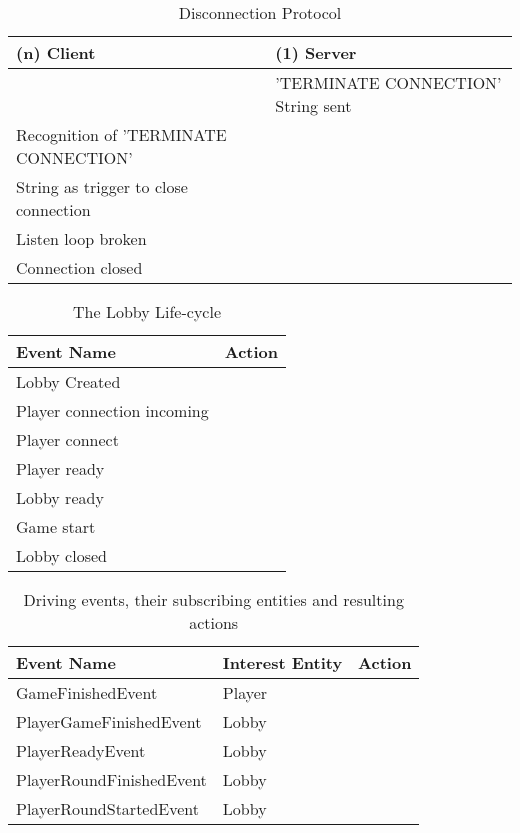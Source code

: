 \begin{table}[H]
	\centering
	\begin{tabular}{ | l | l | }
				\hline
				(n) Client & (1) Server  \\
				\hline
				\hline
				&  'TERMINATE CONNECTION' String sent \\
				\hline
				Recognition of 'TERMINATE CONNECTION' & \\ 
				String as trigger to close connection & \\
				\hline 
				Listen loop broken & \\
				\hline
				Connection closed & \\
				\hline
	\end{tabular}
	\caption{Disconnection Protocol}
	\label{tab:disconnectionProtocol}
\end{table}

\begin{table}[H]
	\centering
	\begin{tabular}{ | l | l | }
		\hline
		Event Name & Action  \\
		\hline
		\hline
		Lobby Created & \\
		\hline
		Player connection incoming & \\
		\hline
		Player connect & \\
		\hline
		Player ready & \\
		\hline
		Lobby ready & \\ 
		\hline
		Game start  & \\
		\hline
		Lobby closed & \\
		\hline
	\end{tabular}
	\caption{The Lobby Life-cycle}
	\label{tab:lobbyLifecycle}
\end{table}

\begin{table}[H]
	\centering
	\begin{tabular}{ | l | l | l | }
		\hline
		Event Name & Interest Entity & Action  \\
		\hline
		\hline
		GameFinishedEvent & Player & \\ 
		\hline
		PlayerGameFinishedEvent & Lobby & \\
		\hline
		PlayerReadyEvent & Lobby & \\
		\hline
		PlayerRoundFinishedEvent & Lobby & \\
		\hline
		PlayerRoundStartedEvent & Lobby & \\
		\hline
	\end{tabular}
	\caption{Driving events, their subscribing entities and resulting actions}
	\label{tab:eventsEntitiesAndActions}
\end{table}
